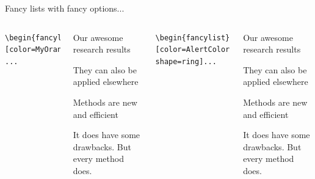 \documentclass[xetex, aspectratio=169,professionalfont]{beamer}
\begin{document}
\begin{frame}[fragile]{Fancy lists with fancy options...}
	\begin{columns}
		\centering
\begin{lstlisting}
\begin{fancylist}[color=MyOrange] ...
\end{lstlisting}
\vspace{\baselineskip}
		\begin{fancylist}[color=MyOrange]
	\item Our awesome research results
	\item They can also be applied elsewhere
	\item Methods are new and efficient
	\item It does have some drawbacks. But every method does. 
	\end{fancylist} 
		
		\centering
\begin{lstlisting}
\begin{fancylist}[color=AlertColor, shape=ring]...
\end{lstlisting}

		\begin{fancylist}[color=AlertColor, shape=ring]
			\item Our awesome research results
			\item They can also be applied elsewhere
			\item Methods are new and efficient
			\item It does have some drawbacks. But every method does. 
		\end{fancylist} 
	\end{columns}
\end{frame}
\end{document}
